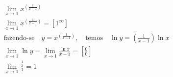 \begin{ex}
\begin{align}
&\lim_{x\rightarrow 1} x^{\left(\frac{1}{x-1}\right)}\nonumber\\
&\lim_{x\rightarrow 1} x^{\left(\frac{1}{x-1}\right)}=[1^\infty]\nonumber\\
&\text{fazendo-se}\quad y=x^{\left(\frac{1}{x-1}\right)}, \quad \text{temos}\quad \ln{y}=\left(\frac{1}{x-1}\right)\ln{x}\nonumber\\
&\lim_{x\rightarrow 1} \ln{y}=\lim_{x\rightarrow 1} \frac{\ln{x}}{x-1}=\left[\frac{0}{0}\right]\nonumber\\
&\lim_{x\rightarrow 1} \frac{\frac{1}{x}}{1}=1\nonumber
\end{align}
\end{ex}